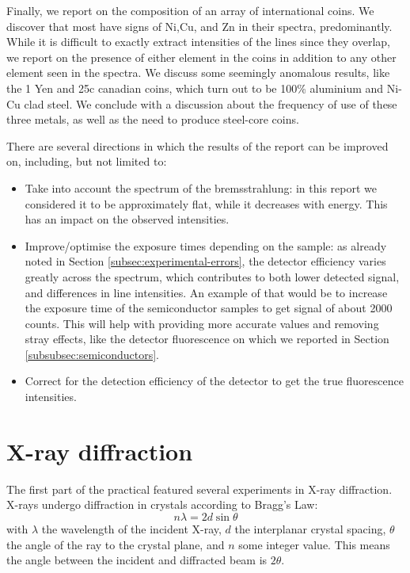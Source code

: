 \documentclass[11pt,a4paper,twoside,onecolumn]{article}
\begin{document}
Finally, we report on the composition of an array of international coins. We discover that most have signs of Ni,Cu, and Zn in their spectra, predominantly. While it is difficult to exactly extract intensities of the lines since they overlap, we report on the presence of either element in the coins in addition to any other element seen in the spectra. We discuss some seemingly anomalous results, like the 1 Yen and 25c canadian coins, which turn out to be 100\% aluminium and Ni-Cu clad steel. We conclude with a discussion about the frequency of use of these three metals, as well as the need to produce steel-core coins.

There are several directions in which the results of the report can be improved on, including, but not limited to:
\begin{itemize}
    \item Take into account the spectrum of the bremsstrahlung: in this report we considered it to be approximately flat, while it decreases with energy. This has an impact on the observed intensities.
    \item Improve/optimise the exposure times depending on the sample: as already noted in Section \ref{subsec:experimental-errors}, the detector efficiency varies greatly across the spectrum, which contributes to both lower detected signal, and differences in line intensities. An example of that would be to increase the exposure time of the semiconductor samples to get signal of about 2000 counts. This will help with providing more accurate values and removing stray effects, like the detector fluorescence on which we reported in Section \ref{subsubsec:semiconductors}.
    \item Correct for the detection efficiency of the detector to get the true fluorescence intensities.
\end{itemize}

\printbibliography

\newpage
\appendix
\renewcommand\thesection{Appendix \Alph{section}}
\renewcommand{\thetable}{\Alph{section}\arabic{table}}
\setcounter{table}{0}
\renewcommand{\thefigure}{\Alph{section}\arabic{figure}}
\setcounter{figure}{0}
\renewcommand{\sectionmark}[1]{\markboth{\thesection.\ #1}{}}

\section{X-ray diffraction}\label{sec:diffraction-experiment}
The first part of the practical featured several experiments in X-ray diffraction. X-rays undergo diffraction in crystals according to Bragg's Law:
\begin{equation}
    n \lambda = 2 d \sin \theta
\end{equation}
with $\lambda$ the wavelength of the incident X-ray, $d$ the interplanar crystal spacing, $\theta$ the angle of the ray to the crystal plane, and $n$ some integer value. This means the angle between the incident and diffracted beam is $2 \theta$.
\end{document}
